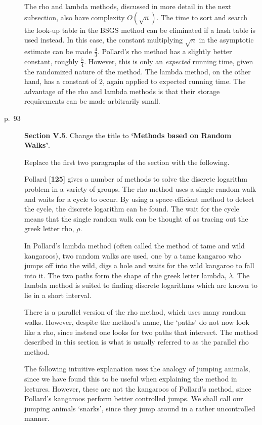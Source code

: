\begin{description}
The rho and lambda methods, discussed in more
detail in the next subsection, also have complexity $O(\sqrt{n})$.
The time to sort and search the look-up table in the BSGS method
can be eliminated if a hash table is used instead.
In this case, the constant multiplying $\sqrt{n}$ in the
asymptotic estimate can be made $\frac{4}{3}$. 
Pollard's rho method has a slightly better constant, roughly 
$\frac{5}{4}$. However, this is only an {\em expected} running time, 
given the randomized nature of the method. The lambda method, 
on the other hand, has a constant of 2, again applied to
expected running time.  The advantage of the rho and lambda methods is 
that their storage requirements can be made arbitrarily small.


\item[p.\ 93] {\bf Section V.5}. Change the title to 
{\bf `Methods based on Random Walks'}.

Replace the first two paragraphs of the section with the following.

Pollard [{\bf 125}] gives a number of methods to solve the discrete logarithm
problem in a variety of groups. The rho method uses a single
random walk and waits for a cycle to occur.  By using a space-efficient 
method to detect the cycle, the discrete logarithm can be
found.  The wait for the cycle means that the single random walk
can be thought of as tracing out the greek letter rho, $\rho$. 

In Pollard's lambda method (often called the method of tame and wild
kangaroos), two random walks are used, one by a tame kangaroo who jumps
off into the wild, digs a hole and waits for the wild kangaroo to
fall into it.  The two paths form the shape of the greek letter lambda,
$\lambda$. The lambda method is suited to finding 
discrete logarithms which are known to lie in a short interval.

There is a parallel version of the rho method, which uses many random
walks.  However, despite the method's name,
the `paths' do not now look like a rho, since instead one
looks for two paths that intersect.  The method described
in this section is what is usually referred to as the parallel rho 
method.

The following intuitive explanation uses the analogy of jumping animals,
since we have found this to be useful when explaining the method in
lectures.  However, these are not the kangaroos of Pollard's method, since
Pollard's kangaroos perform better controlled jumps. We shall call 
our jumping animals `snarks', since they jump around in 
a rather uncontrolled manner.


\end{description}
